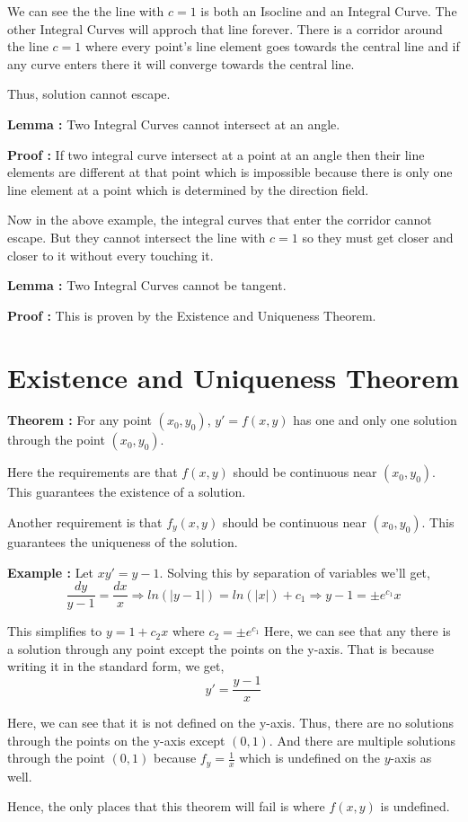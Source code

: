 We can see the the line with $c = 1$ is both an Isocline and an Integral Curve.
The other Integral Curves will approch that line forever.
There is a corridor around the line $c = 1$ where every point's line element goes towards the central line
and if any curve enters there it will converge towards the central line.

Thus, solution cannot escape.
\begin{mdframed}
{\bf Lemma : } Two Integral Curves cannot intersect at an angle.

{\bf Proof : } If two integral curve intersect at a point at an angle then their line elements are different at that point which is impossible
because there is only one line element at a point which is determined by the direction field.
\end{mdframed}

Now in the above example, the integral curves that enter the corridor cannot escape.
But they cannot intersect the line with $c = 1$ so they must get closer and closer to it without every touching it.

\begin{mdframed}
{\bf Lemma : } Two Integral Curves cannot be tangent.

{\bf Proof : } This is proven by the Existence and Uniqueness Theorem.
\end{mdframed}


\section{Existence and Uniqueness Theorem}

\begin{mdframed}
{\bf Theorem : } For any point $(x_0, y_0)$, $y' = f(x, y)$ has one and only one solution through the point $(x_0, y_0)$.
\end{mdframed}

Here the requirements are that $f(x, y)$ should be continuous near $(x_0, y_0)$.
This guarantees the existence of a solution.

Another requirement is that $f_y(x, y)$ should be continuous near $(x_0, y_0)$.
This guarantees the uniqueness of the solution.


{\bf Example : } Let $xy' = y - 1$.
Solving this by separation of variables we'll get,
$$ \frac{dy}{y-1} = \frac{dx}{x}
\Rightarrow
ln(|y-1|) = ln(|x|) + c_1
\Rightarrow
y - 1 = \pm e^{c_1} x
$$

This simplifies to $y = 1 + c_2x$ where $c_2 = \pm e^{c_1}$
Here, we can see that any there is a solution through any point except the points on the y-axis.
That is because writing it in the standard form, we get, $$y' = \frac{y-1}{x}$$

Here, we can see that it is not defined on the y-axis.
Thus, there are no solutions through the points on the y-axis except $(0, 1)$.
And there are multiple solutions through the point $(0, 1)$ because $f_y = \frac{1}{x}$ which is undefined on the $y$-axis as well.


Hence, the only places that this theorem will fail is where $f(x, y)$ is undefined.